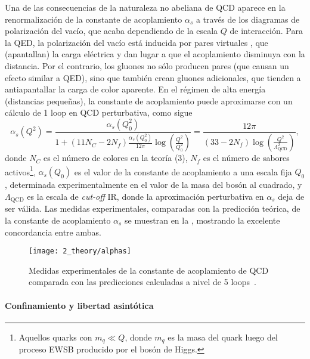 Una de las consecuencias de la naturaleza no abeliana de \ac{QCD} aparece en la renormalización de la constante de acoplamiento \(\alpha_s\) a través de los diagramas de polarización del vacío, que acaba dependiendo de la escala \(Q\) de interacción. Para la \ac{QED}, la polarización del vacío está inducida por pares virtuales \ee, que (apantallan) la carga eléctrica y dan lugar a que el acoplamiento disminuya con la distancia. Por el contrario, los gluones no sólo producen pares \qqbar (que causan un efecto similar a \ac{QED}), sino que también crean gluones adicionales, que tienden a antiapantallar la carga de color aparente. En el régimen de alta energía (distancias pequeñas), la constante de acoplamiento puede aproximarse con un cálculo de 1 loop en \ac{QCD} perturbativa, como sigue
\begin{equation}
    \label{eq:theory:sm:mathematical:qcd:alphas}
    \alpha_s\left(Q^2\right) = 
    \frac{
        \alpha_s\left(Q^2_0\right)
    }{
        1 + \left(11 N_C - 2 N_f\right) \frac{\alpha_s\left(Q_0^2\right)}{12\pi} \log \left(\frac{Q^2}{Q_0^2}\right)
    }
    =
    \frac{
        12\pi
    }{
        \left(33 - 2 N_f\right)  \log \left(\frac{Q^2}{\Lambda_{\text{QCD}}^2}\right)
    },
\end{equation}
donde \(N_C\) es el número de colores en la teoría (3), \(N_f\) es el número de sabores activos\footnote{Aquellos quarks con \(m_q \ll Q\), donde \(m_q\) es la masa del quark luego del proceso \ac{EWSB} producido por el bosón de Higgs.}, \(\alpha_s\left(Q_0\right)\) es el valor de la constante de acoplamiento a una escala fija \(Q_0\), determinada experimentalmente en el valor de la masa del bosón \Zboson al cuadrado, y \(\Lambda_{\text{QCD}}\) es la escala de \textit{cut-off} \ac{IR}, donde la aproximación perturbativa en \(\alpha_s\) deja de ser válida. Las medidas experimentales, comparadas con la predicción teórica, de la constante de acoplamiento \(\alpha_s\) se muestran en la \Fig{\ref{fig:theory:sm:mathematical:qcd:alphas}}, mostrando la excelente concordancia entre ambas.

\begin{figure}[ht!]
    \centering
    \texttt{[image: 2\_theory/alphas]}
    \caption{Medidas experimentales de la constante de acoplamiento de \ac{QCD} comparada con las predicciones calculadas a nivel de 5 loops~\cite{ParticleDataGroup2024}.}
    \label{fig:theory:sm:mathematical:qcd:alphas}
\end{figure}


\paragraph{Confinamiento y libertad asint\'otica}

